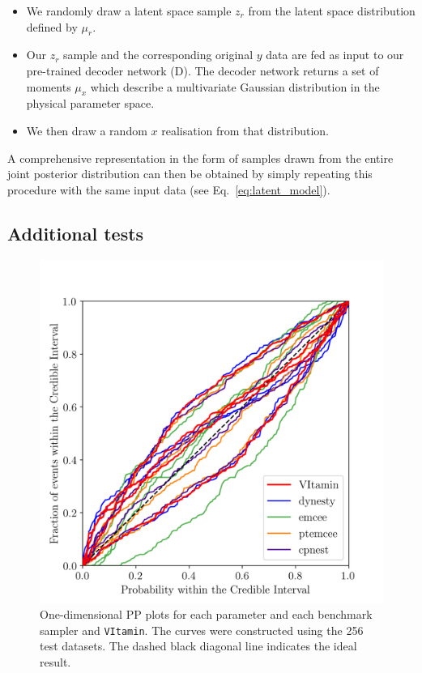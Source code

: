 %
%
\begin{itemize}
%
\item We randomly draw a latent space sample $z_r$ from the latent space
distribution defined by $\mu_r$.
%
\item Our $z_r$ sample and the corresponding original $y$ data are fed as input to our
pre-trained decoder network (D). The decoder network returns a set of moments
$\mu_{x}$ which describe a multivariate Gaussian distribution in the physical
parameter space.
%
\item We then draw a random $x$ realisation from that distribution.
%
\end{itemize}
%

%
%
A comprehensive representation in the form of samples drawn from the entire joint
posterior distribution can then be obtained by simply repeating this procedure
with the same input data (see Eq.~\ref{eq:latent_model}).

%
%
\subsection{Additional tests}
%
%
\begin{figure}
    \includegraphics[width=\columnwidth]{latest_pp_plot.png}
    \caption[One-dimensional \ac{PP} plots for each
parameter and each benchmark sampler and \texttt{VItamin}.]{\label{fig:pp_plot} One-dimensional \ac{PP} plots for each
parameter and each benchmark sampler and \texttt{VItamin}.  The curves were
constructed using the 256 test datasets. The dashed black diagonal line
indicates the ideal result.
}
\end{figure}
%

